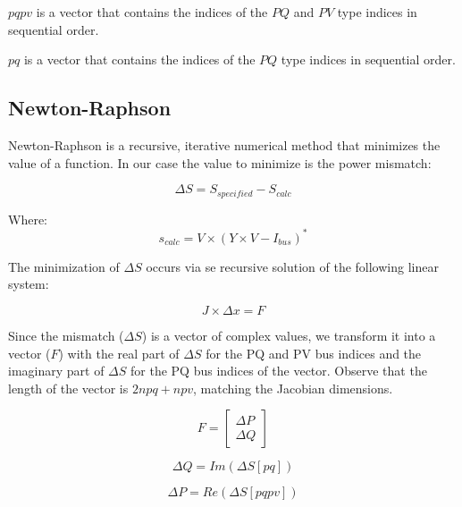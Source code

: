 \documentclass[a4paper,twoside,fleqn]{tufte-book}
\begin{document}
$pqpv$ is a vector that contains the indices of the $PQ$ and $PV$ type indices in sequential order.

$pq$ is a vector that contains the indices of the $PQ$  type indices in sequential order.

\newpage
\subsection{Newton-Raphson}

Newton-Raphson is a recursive, iterative numerical method that minimizes the value of a function. In our case the value to minimize is the power mismatch:

\begin{equation}
\Delta S = S_{specified} - S_{calc} 
\end{equation}

Where:
\begin{equation}
s_{calc} = V \times (Y \times V - I_{bus})^*
\label{eq:nr_Scalc}
\end{equation}

The minimization of $\Delta S$ occurs via se recursive solution of the following linear system:

\begin{equation}
J \times \Delta x = F
\end{equation}

Since the mismatch ($\Delta S$) is a vector of complex values, we transform it into a vector ($F$) with the real part of $\Delta S$ for the PQ and PV bus indices and the imaginary part of $\Delta S$ for the PQ bus indices of the vector. Observe that the length of the vector is $2npq+npv$, matching the Jacobian dimensions.



\begin{equation}
F =  \left[
\begin{array}{c}
\Delta P \\
\Delta Q  
\end{array}
\right]
\label{eq:nr_mismatch}
\end{equation}

\begin{equation}
\Delta Q = Im(\Delta S[pq]) 
\label{eq:nr_q_inc}
\end{equation}

\begin{equation}
\Delta P = Re(\Delta S[pqpv])
\label{eq:nr_p_inc}
\end{equation}
\end{document}
